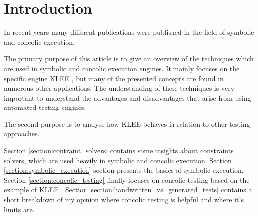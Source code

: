 \section{Introduction}
In recent years many different publications were published in the field of symbolic and concolic execution. 

The primary purpose of this article is to give an overview of the techniques which are used in symbolic and concolic execution engines.
It mainly focuses on the specific engine KLEE \cite{Cadar:2008:KUA:1855741.1855756}, but many of the presented concepts are found in numerous other applications.
The understanding of these techniques is very important to understand the advantages and disadvantages that arise from using automated testing engines.

The second purpose is to analyse how KLEE behaves in relation to other testing approaches.

Section \ref{section:contraint_solvers} contains some insights about constraints solvers, which are used heavily in symbolic and concolic execution.
Section \ref{section:symbolic_execution} section presents the basics of symbolic execution.
Section \ref{section:concolic_testing} finally focuses on concolic testing based on the example of KLEE \cite{Cadar:2008:KUA:1855741.1855756}. 
Section \ref{section:handwritten_vs_generated_tests} contains a short breakdown of my opinion where concolic testing is helpful and where it's limits are.